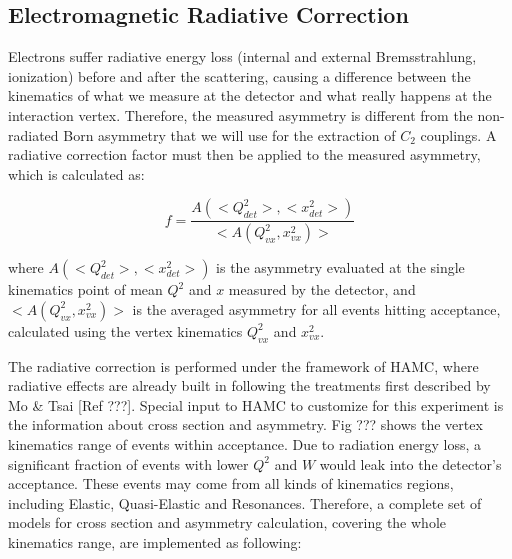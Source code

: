 \subsection{Electromagnetic Radiative Correction}\label{sec:rad_cor}

Electrons suffer radiative energy loss (internal and external
Bremsstrahlung, ionization) before and after the
scattering, causing a difference between the kinematics of what we
measure at the detector and what really happens at the interaction
vertex. Therefore, the measured asymmetry is different from the
non-radiated Born asymmetry that we will use for the extraction of
$C_2$ couplings. A radiative correction factor must then be applied to the
measured asymmetry, which is calculated as:

\begin{equation}
f=\frac {A(<Q_{det}^2>, <x_{det}^2>)}{<A(Q_{vx}^2, x_{vx}^2)>}
\end{equation}

where $A(<Q_{det}^2>, <x_{det}^2>)$ is the asymmetry evaluated at the
single kinematics point of mean $Q^2$ and $x$ measured by the
detector, and $<A(Q_{vx}^2, x_{vx}^2)>$ is the averaged asymmetry for
all events hitting acceptance, calculated using the vertex kinematics
$Q_{vx}^2$ and $x_{vx}^2$. 

The radiative correction is performed under the framework of HAMC,
where radiative effects are already built in following the treatments
first described by Mo \& Tsai [Ref ???]. Special input to HAMC to
customize for
this experiment is the information about cross section and asymmetry. 
Fig ??? shows the vertex kinematics range of events within
acceptance. Due to radiation energy loss, a significant fraction of events with
lower $Q^2$ and $W$ would leak into the detector's
acceptance. These events may come from all kinds of kinematics
regions, including Elastic, Quasi-Elastic and Resonances. Therefore, a
complete set of models for cross section and asymmetry calculation,
covering the whole kinematics range, are implemented as following:

